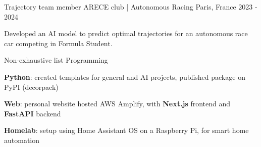 

\begin{cventries}

    \cventry
    {Trajectory team member} %
    {ARECE club | Autonomous Racing} %
    {Paris, France} %
    {2023 - 2024} %
    {
        \begin{cvitems} %
            Developed an AI model to predict optimal trajectories for an autonomous race car competing in Formula
            Student.
        \end{cvitems}
    }

    \cventry
    {Non-exhaustive list} %
    {Programming} %
    {~} %
    {~} %
    {
        \begin{cvitems} %
            \item{\textbf{Python}: created templates for general and AI projects,
                published package on PyPI (decorpack) }
            \item{\textbf{Web}: personal website hosted AWS Amplify, with \textbf{Next.js} frontend and \textbf
            {FastAPI} backend}
            \item{\textbf{Homelab}: setup using Home Assistant OS on a Raspberry Pi,
                for smart home automation}
        \end{cvitems}
    }


\end{cventries}

